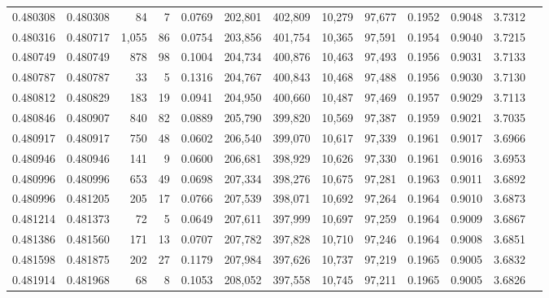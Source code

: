 \begin{tabular}{rrrrrrrrrrrrr}
0.480308 & 0.480308 &    84 &     7 &                                     0.0769 & 202,801 & 402,809 &  10,279 &  97,677 & 0.1952 & 0.9048 & 3.7312 \\
0.480316 & 0.480717 & 1,055 &    86 &                                     0.0754 & 203,856 & 401,754 &  10,365 &  97,591 & 0.1954 & 0.9040 & 3.7215 \\
0.480749 & 0.480749 &   878 &    98 &                                     0.1004 & 204,734 & 400,876 &  10,463 &  97,493 & 0.1956 & 0.9031 & 3.7133 \\
0.480787 & 0.480787 &    33 &     5 &                                     0.1316 & 204,767 & 400,843 &  10,468 &  97,488 & 0.1956 & 0.9030 & 3.7130 \\
0.480812 & 0.480829 &   183 &    19 &                                     0.0941 & 204,950 & 400,660 &  10,487 &  97,469 & 0.1957 & 0.9029 & 3.7113 \\
0.480846 & 0.480907 &   840 &    82 &                                     0.0889 & 205,790 & 399,820 &  10,569 &  97,387 & 0.1959 & 0.9021 & 3.7035 \\
0.480917 & 0.480917 &   750 &    48 &                                     0.0602 & 206,540 & 399,070 &  10,617 &  97,339 & 0.1961 & 0.9017 & 3.6966 \\
0.480946 & 0.480946 &   141 &     9 &                                     0.0600 & 206,681 & 398,929 &  10,626 &  97,330 & 0.1961 & 0.9016 & 3.6953 \\
0.480996 & 0.480996 &   653 &    49 &                                     0.0698 & 207,334 & 398,276 &  10,675 &  97,281 & 0.1963 & 0.9011 & 3.6892 \\
0.480996 & 0.481205 &   205 &    17 &                                     0.0766 & 207,539 & 398,071 &  10,692 &  97,264 & 0.1964 & 0.9010 & 3.6873 \\
0.481214 & 0.481373 &    72 &     5 &                                     0.0649 & 207,611 & 397,999 &  10,697 &  97,259 & 0.1964 & 0.9009 & 3.6867 \\
0.481386 & 0.481560 &   171 &    13 &                                     0.0707 & 207,782 & 397,828 &  10,710 &  97,246 & 0.1964 & 0.9008 & 3.6851 \\
0.481598 & 0.481875 &   202 &    27 &                                     0.1179 & 207,984 & 397,626 &  10,737 &  97,219 & 0.1965 & 0.9005 & 3.6832 \\
0.481914 & 0.481968 &    68 &     8 &                                     0.1053 & 208,052 & 397,558 &  10,745 &  97,211 & 0.1965 & 0.9005 & 3.6826 \\

\end{tabular}
